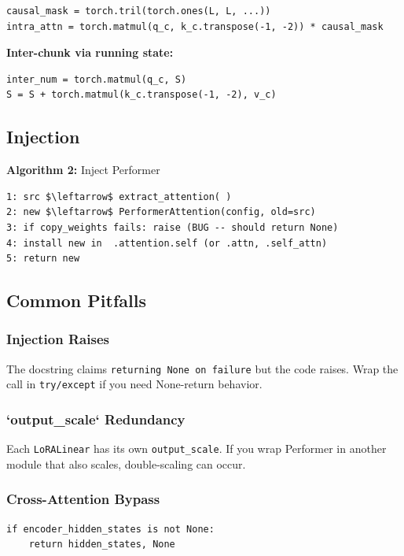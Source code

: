 \begin{lstlisting}
causal_mask = torch.tril(torch.ones(L, L, ...))
intra_attn = torch.matmul(q_c, k_c.transpose(-1, -2)) * causal_mask
\end{lstlisting}

\textbf{Inter-chunk via running state:}

\begin{lstlisting}
inter_num = torch.matmul(q_c, S)
S = S + torch.matmul(k_c.transpose(-1, -2), v_c)
\end{lstlisting}

\subsection{Injection}

\textbf{Algorithm 2:} Inject Performer
\begin{lstlisting}
1: src $\leftarrow$ extract_attention( )
2: new $\leftarrow$ PerformerAttention(config, old=src)
3: if copy_weights fails: raise (BUG -- should return None)
4: install new in  .attention.self (or .attn, .self_attn)
5: return new
\end{lstlisting}

\subsection{Common Pitfalls}

\subsubsection{Injection Raises}

The docstring claims \texttt{returning None on failure} but the code raises. 
Wrap the call in \texttt{try/except} if you need None-return behavior.

\subsubsection{`output\_scale` Redundancy}

Each \texttt{LoRALinear} has its own \texttt{output\_scale}. If you wrap Performer in 
another module that also scales, double-scaling can occur.

\subsubsection{Cross-Attention Bypass}

\begin{lstlisting}
if encoder_hidden_states is not None:
    return hidden_states, None
\end{lstlisting}

